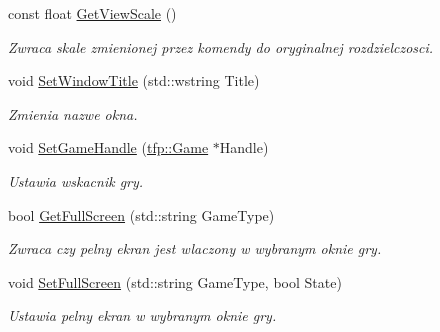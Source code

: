 \begin{DoxyCompactItemize}
\mbox{\label{classtfp_1_1_screen_a291e2adea82570ac89dd57fba8674fdf}} 
const float \mbox{\hyperlink{classtfp_1_1_screen_a291e2adea82570ac89dd57fba8674fdf}{Get\+View\+Scale}} ()
\begin{DoxyCompactList}\small\item\em Zwraca skale zmienionej przez komendy do oryginalnej rozdzielczosci. \end{DoxyCompactList}\item 
\mbox{\label{classtfp_1_1_screen_a134be9e36c0ff4761fe81d25045f4806}} 
void \mbox{\hyperlink{classtfp_1_1_screen_a134be9e36c0ff4761fe81d25045f4806}{Set\+Window\+Title}} (std\+::wstring Title)
\begin{DoxyCompactList}\small\item\em Zmienia nazwe okna. \end{DoxyCompactList}\item 
\mbox{\label{classtfp_1_1_screen_a7e3775842c52977385ab5d98ba0bf31d}} 
void \mbox{\hyperlink{classtfp_1_1_screen_a7e3775842c52977385ab5d98ba0bf31d}{Set\+Game\+Handle}} (\mbox{\hyperlink{classtfp_1_1_game}{tfp\+::\+Game}} $\ast$Handle)
\begin{DoxyCompactList}\small\item\em Ustawia wskacnik gry. \end{DoxyCompactList}\item 
\mbox{\label{classtfp_1_1_screen_a81bf8070d65936fb5dd3a0b186137ea0}} 
bool \mbox{\hyperlink{classtfp_1_1_screen_a81bf8070d65936fb5dd3a0b186137ea0}{Get\+Full\+Screen}} (std\+::string Game\+Type)
\begin{DoxyCompactList}\small\item\em Zwraca czy pelny ekran jest wlaczony w wybranym oknie gry. \end{DoxyCompactList}\item 
\mbox{\label{classtfp_1_1_screen_a35c1f8551d84675694a0b3fc06161dee}} 
void \mbox{\hyperlink{classtfp_1_1_screen_a35c1f8551d84675694a0b3fc06161dee}{Set\+Full\+Screen}} (std\+::string Game\+Type, bool State)
\begin{DoxyCompactList}\small\item\em Ustawia pelny ekran w wybranym oknie gry. \end{DoxyCompactList}\item 

\end{DoxyCompactItemize}
